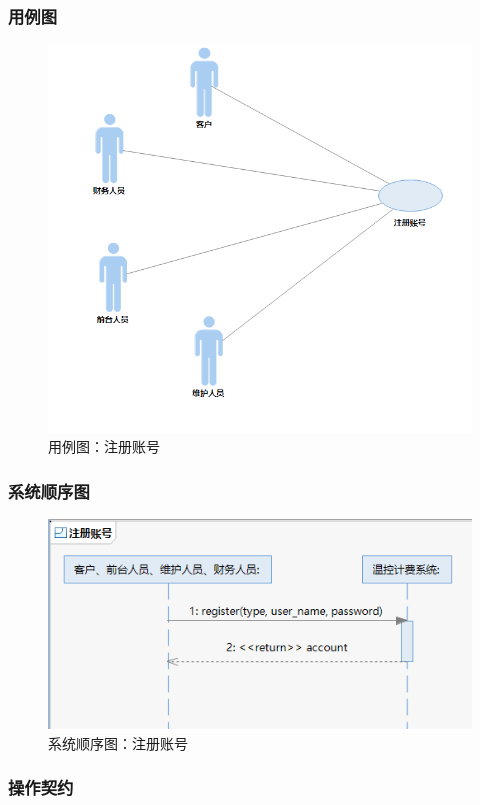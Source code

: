 \documentclass[black,normal,cn]{elegantnote}
\begin{document}
\subsubsection{用例图}

\begin{figure}[H]
    \centering
    \includegraphics[width=.5\textwidth]{fig/276005.png}
    \caption{用例图：注册账号}
    \label{fig:276005}
\end{figure}

\subsubsection{系统顺序图}

\begin{figure}[H]
    \centering
    \includegraphics[width=.8\textwidth]{fig/276006.png}
    \caption{系统顺序图：注册账号}
    \label{fig:276006}
\end{figure}

\subsubsection{操作契约}
\end{document}
